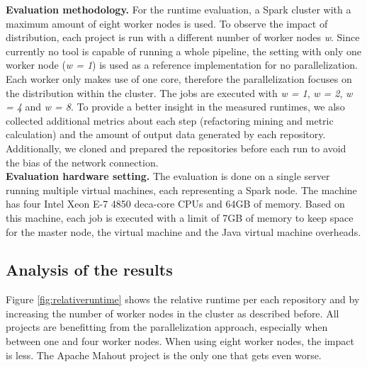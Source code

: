 \textbf{Evaluation methodology.} For the runtime evaluation, a Spark cluster with a maximum amount of eight worker nodes is used. To observe the impact of distribution, each project is run with a different number of worker nodes \emph{w}. Since currently no tool is capable of running a whole pipeline, the setting with only one worker node (\emph{w = 1}) is used as a reference implementation for no parallelization. Each worker only makes use of one core, therefore the parallelization focuses on the distribution within the cluster. The jobs are executed with \emph{w = 1}, \emph{w = 2}, \emph{w = 4} and \emph{w = 8}. To provide a better insight in the measured runtimes, we also collected additional metrics about each step (refactoring mining and metric calculation) and the amount of output data generated by each repository. Additionally, we cloned and prepared the repositories before each run to avoid the bias of the network connection.\\
\textbf{Evaluation hardware setting.} The evaluation is done on a single server running multiple virtual machines, each representing a Spark node. The machine has four Intel Xeon E-7 4850 deca-core CPUs and 64GB of memory. Based on this machine, each job is executed with a limit of 7GB of memory to keep space for the master node, the virtual machine and the Java virtual machine overheads.

\subsection{Analysis of the results}
Figure \ref{fig:relativeruntime} shows the relative runtime per each repository and by increasing the number of worker nodes in the cluster as described before. All projects are benefitting from the parallelization approach, especially when between one and four worker nodes. When using eight worker nodes, the impact is less. The Apache Mahout project is the only one that gets even worse.

